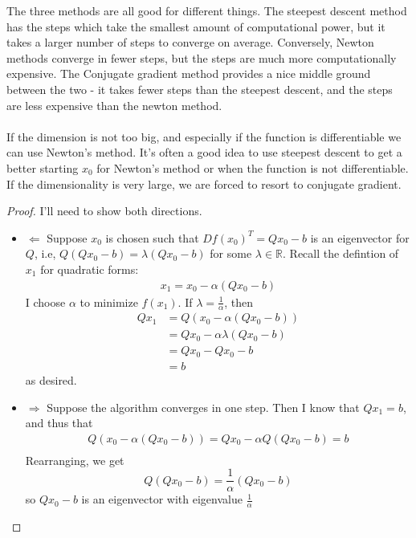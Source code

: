 \documentclass[12pt]{article}
\newenvironment{problem}[2][Problem]{\begin{trivlist}
\item[\hskip \labelsep {\bfseries #1}\hskip \labelsep {\bfseries #2.}]}{\end{trivlist}}
\theoremstyle{definition}
\theoremstyle{definition}
\theoremstyle{definition}
\theoremstyle{definition}
\begin{document}
\begin{problem}{9.3}
The three methods are all good for different things. The steepest descent method has the steps which take the smallest amount of computational power, but it takes a larger number of steps to converge on average. Conversely, Newton methods converge in fewer steps, but the steps are much more computationally expensive. The Conjugate gradient method provides a nice middle ground between the two - it takes fewer steps than the steepest descent, and the steps are less expensive than the newton method.
\\
\\
If the dimension is not too big, and especially if the function is differentiable we can use Newton's method. It's often a good idea to use steepest descent to get a better starting $x_0$ for Newton's method or when the function is not differentiable. If the dimensionality is very large, we are forced to resort to conjugate gradient.
\end{problem}

\begin{problem}{9.4}
\begin{proof}
I'll need to show both directions.
\begin{itemize}
\item $\Leftarrow$ Suppose $x_0$ is chosen such that $Df(x_0)^T = Qx_0 - b$ is an eigenvector for $Q$, i.e, $Q(Qx_0-b) = \lambda (Qx_0-b)$ for some $\lambda \in \mathbb{R}$. Recall the defintion of $x_1$ for quadratic forms: 
\begin{align*}
x_1 = x_0 - \alpha (Qx_0 - b)
\end{align*}
I choose $\alpha$ to minimize $f(x_1)$. If $\lambda = \frac{1}{\alpha}$, then 
\begin{align*}
Qx_1 &= Q(x_0 - \alpha (Qx_0 - b)) \\ 
&= Qx_0 - \alpha\lambda(Qx_0 - b) \\
&= Qx_0 - Qx_0 - b\\
&= b
\end{align*}
as desired.
\item $\Rightarrow$
Suppose the algorithm converges in one step. Then I know that $Qx_1 = b$, and thus that 
\begin{align*}
Q (x_0 - \alpha (Qx_0 -b)) = Qx_0 - \alpha Q(Qx_0-b) = b \\
\end{align*}
Rearranging, we get 
$$Q(Qx_0-b) = \frac{1}{\alpha}(Qx_0 - b) $$
so $Qx_0-b$ is an eigenvector with eigenvalue $\frac{1}{\alpha}$ \\
\end{itemize}
\end{proof} 
\end{problem}
\end{document}
